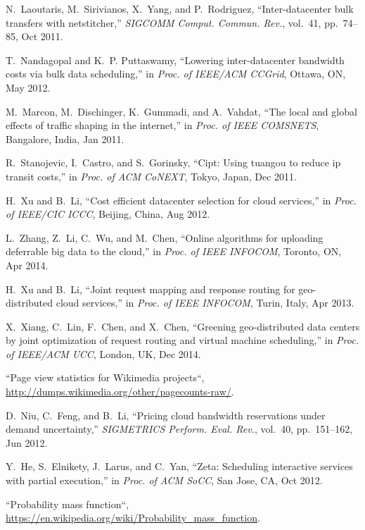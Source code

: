 \documentclass[10pt,journal,compsoc]{IEEEtran}
\begin{document}
\begin{thebibliography}{10}
N.~Laoutaris, M.~Sirivianos, X.~Yang, and P.~Rodriguez, ``Inter-datacenter bulk
  transfers with netstitcher,'' {\em SIGCOMM Comput. Commun. Rev.}, vol.~41,
  pp.~74--85, Oct 2011.

T.~Nandagopal and K.~P. Puttaswamy, ``Lowering inter-datacenter bandwidth costs
  via bulk data scheduling,'' in {\em Proc. of IEEE/ACM CCGrid}, Ottawa, ON, May 2012.

M.~Marcon, M.~Dischinger, K.~Gummadi, and A.~Vahdat, ``The local and global
  effects of traffic shaping in the internet,'' in {\em Proc. of IEEE
  COMSNETS}, Bangalore, India, Jan 2011.

R.~Stanojevic, I.~Castro, and S.~Gorinsky, ``Cipt: Using tuangou to reduce ip
  transit costs,'' in {\em Proc. of ACM CoNEXT}, Tokyo, Japan,
  Dec 2011.

H.~Xu and B.~Li, ``Cost efficient datacenter selection for cloud services,'' in
  {\em Proc. of IEEE/CIC ICCC}, Beijing, China, Aug 2012.

L.~Zhang, Z.~Li, C.~Wu, and M.~Chen, ``Online algorithms for uploading
  deferrable big data to the cloud,'' in {\em Proc. of IEEE INFOCOM}, Toronto, ON, Apr 2014.

H.~Xu and B.~Li, ``Joint request mapping and response routing for
  geo-distributed cloud services,'' in {\em Proc. of IEEE INFOCOM}, Turin, Italy, Apr 2013.

X.~Xiang, C.~Lin, F.~Chen, and X.~Chen, ``Greening geo-distributed data centers
  by joint optimization of request routing and virtual machine scheduling,'' in
  {\em Proc. of IEEE/ACM UCC}, London, UK, Dec 2014.

``Page view statistics for Wikimedia projects``, \url{http://dumps.wikimedia.org/other/pagecounts-raw/}.

D.~Niu, C.~Feng, and B.~Li, ``Pricing cloud bandwidth reservations under demand
  uncertainty,'' {\em SIGMETRICS Perform. Eval. Rev.}, vol.~40, pp.~151--162,
  Jun 2012.

Y.~He, S.~Elnikety, J.~Larus, and C.~Yan, ``Zeta: Scheduling interactive
  services with partial execution,'' in {\em Proc. of ACM SoCC}, San Jose, CA, Oct 2012.

``Probability mass function``, \url{https://en.wikipedia.org/wiki/Probability_mass_function}.


\end{thebibliography}
\end{document}

